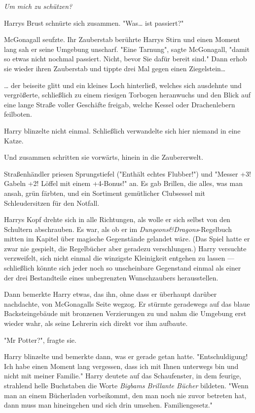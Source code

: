 {\emph{Um mich zu schützen?}

Harrys Brust schnürte sich zusammen. "Was… ist passiert?"

McGonagall seufzte. Ihr Zauberstab berührte Harrys Stirn und einen Moment lang sah er seine Umgebung unscharf. "Eine Tarnung", sagte McGonagall, "damit so etwas nicht nochmal passiert. Nicht, bevor Sie dafür bereit sind." Dann erhob sie wieder ihren Zauberstab und tippte drei Mal gegen einen Ziegelstein…

… der beiseite glitt und ein kleines Loch hinterließ, welches sich ausdehnte und vergrößerte, schließlich zu einem riesigen Torbogen heranwuchs und den Blick auf eine lange Straße voller Geschäfte freigab, welche Kessel oder Drachenlebern feilboten.

Harry blinzelte nicht einmal. Schließlich verwandelte sich hier niemand in eine Katze.

Und zusammen schritten sie vorwärts, hinein in die Zaubererwelt.

Straßenhändler priesen Sprungstiefel ("Enthält echtes Flubber!") und "Messer +3! Gabeln +2! Löffel mit einem +4-Bonus!" an. Es gab Brillen, die alles, was man ansah, grün färbten, und ein Sortiment gemütlicher Clubsessel mit Schleudersitzen für den Notfall.

Harrys Kopf drehte sich in alle Richtungen, als wolle er sich selbst von den Schultern abschrauben. Es war, als ob er im \emph{Dungeons\&Dragons}-Regelbuch mitten im Kapitel über magische Gegenstände gelandet wäre. (Das Spiel hatte er zwar nie gespielt, die Regelbücher aber geradezu verschlungen.) Harry versuchte verzweifelt, sich nicht einmal die winzigste Kleinigkeit entgehen zu lassen --- schließlich könnte sich jeder noch so unscheinbare Gegenstand einmal als einer der drei Bestandteile eines unbegrenzten Wunschzaubers herausstellen.

Dann bemerkte Harry etwas, das ihn, ohne dass er überhaupt darüber nachdachte, von McGonagalls Seite wegzog. Er stürmte geradewegs auf das blaue Backsteingebäude mit bronzenen Verzierungen zu und nahm die Umgebung erst wieder wahr, als seine Lehrerin sich direkt vor ihm aufbaute.

"Mr Potter?", fragte sie.

Harry blinzelte und bemerkte dann, was er gerade getan hatte. "Entschuldigung! Ich habe einen Moment lang vergessen, dass ich mit Ihnen unterwegs bin und nicht mit meiner Familie." Harry deutete auf das Schaufenster, in dem feurige, strahlend helle Buchstaben die Worte \emph{Bigbams Brillante Bücher} bildeten. "Wenn man an einem Bücherladen vorbeikommt, den man noch nie zuvor betreten hat, dann muss man hineingehen und sich drin umsehen. Familiengesetz."

}
